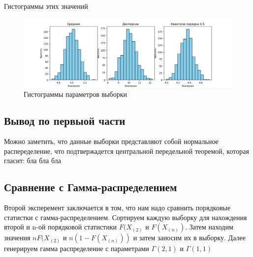 \documentclass{article}
\begin{document}
Гистограммы этих значений
\begin{figure}[H]
      \centering
      \includegraphics[width=0.8\linewidth]{Python/first-exp.png}
      \caption{Гистограммы параметров выборки}
\end{figure}

\subsection{Вывод по первыой части}
Можно заметить, что данные выборки представляют собой нормальное распеределение, что подтвержадется центральной передельной теоремой, которая гласит: бла бла бла


\subsection{Сравнение с Гамма-распределением}
Второй эксперемент заключается в том, что нам надо сравнить порядковые статистки с гамма-распределением.
Сортируем каждую выборку для нахождения второй и n-ой порядковой статистики $F(X_{(2)}$ и $F(X_{(n)})$.
Затем находим значения $nF(X_{(2)}$ и $n(1 - F(X_{(n)}))$ и затем заносим их в выборку.
Далее генерируем гамма распределение с параметрами $\Gamma(2, 1)$ и $\Gamma(1, 1)$
\end{document}
